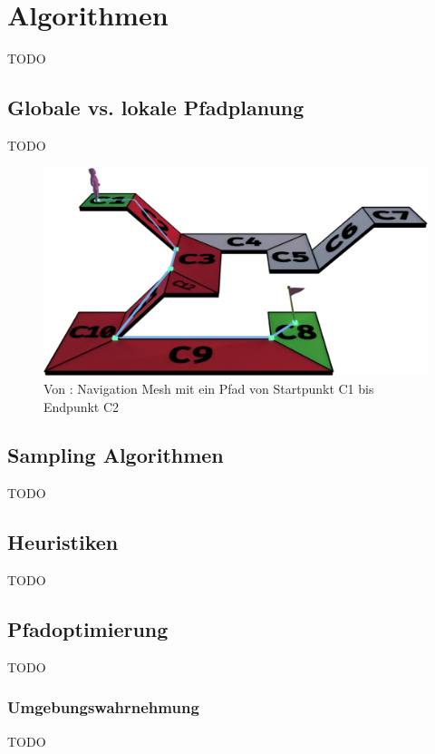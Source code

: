 \chapter{Algorithmen}

TODO

\section{Globale vs. lokale Pfadplanung }

TODO

\begin{figure} %
	\centering
	\includegraphics[width=\textwidth]{images/mesh_with_path.png}
	\caption{Von \cite{Mesh:18}: Navigation Mesh mit ein Pfad von Startpunkt C1 bis Endpunkt C2}
	\label{sec1a}
\end{figure}



\section{Sampling Algorithmen}
TODO



\section{Heuristiken}
TODO


\section{Pfadoptimierung}
TODO


\subsection{Umgebungswahrnehmung}
TODO


